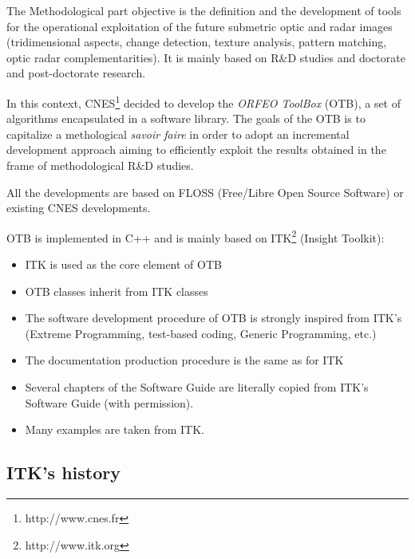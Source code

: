 The Methodological part objective is the definition and the
development of tools for the operational exploitation of the future
submetric optic and radar images (tridimensional aspects, change
detection, texture analysis, pattern matching, optic radar
complementarities). It is mainly based on R\&D studies and doctorate
and post-doctorate research.

In this context, CNES\footnote{http://www.cnes.fr} decided to develop
the \emph{ORFEO ToolBox} (OTB), a set of algorithms encapsulated in a
software library. The goals of the OTB is to capitalize a methological
\textit{savoir faire} in order to adopt an incremental development
approach aiming to efficiently exploit the results obtained in the
frame of methodological R\&D studies.

All the developments are based on FLOSS (Free/Libre Open Source
Software) or existing CNES developments.

OTB is implemented in C++ and is mainly based on
ITK\footnote{http://www.itk.org} (Insight Toolkit):
\begin{itemize}
  \item ITK is used as the core element of OTB
  \item OTB classes inherit from ITK classes
  \item The software development procedure of OTB is strongly inspired
  from ITK's (Extreme Programming, test-based coding, Generic
  Programming, etc.)
  \item The documentation production procedure is the same as for ITK
  \item Several chapters of the Software Guide are literally copied
  from ITK's Software Guide (with permission).
  \item Many examples are taken from ITK.
\end{itemize}

\subsection{ITK's history}

